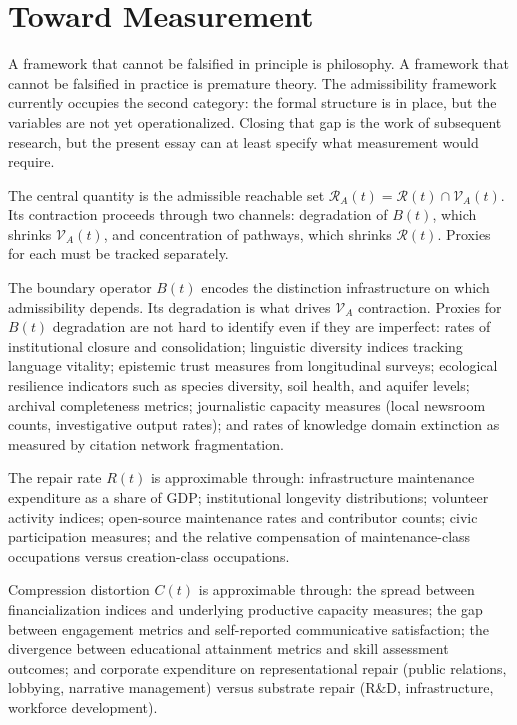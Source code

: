 \documentclass[11pt, letterpaper]{article}
\begin{document}
\section{Toward Measurement}

A framework that cannot be falsified in principle is philosophy. A framework that cannot be falsified in practice is premature theory. The admissibility framework currently occupies the second category: the formal structure is in place, but the variables are not yet operationalized. Closing that gap is the work of subsequent research, but the present essay can at least specify what measurement would require.

The central quantity is the admissible reachable set $\mathcal{R}_A(t) = \mathcal{R}(t) \cap \mathcal{V}_A(t)$. Its contraction proceeds through two channels: degradation of $B(t)$, which shrinks $\mathcal{V}_A(t)$, and concentration of pathways, which shrinks $\mathcal{R}(t)$. Proxies for each must be tracked separately.

The boundary operator $B(t)$ encodes the distinction infrastructure on which admissibility depends. Its degradation is what drives $\mathcal{V}_A$ contraction. Proxies for $B(t)$ degradation are not hard to identify even if they are imperfect: rates of institutional closure and consolidation; linguistic diversity indices tracking language vitality; epistemic trust measures from longitudinal surveys; ecological resilience indicators such as species diversity, soil health, and aquifer levels; archival completeness metrics; journalistic capacity measures (local newsroom counts, investigative output rates); and rates of knowledge domain extinction as measured by citation network fragmentation.

The repair rate $R(t)$ is approximable through: infrastructure maintenance expenditure as a share of GDP; institutional longevity distributions; volunteer activity indices; open-source maintenance rates and contributor counts; civic participation measures; and the relative compensation of maintenance-class occupations versus creation-class occupations.

Compression distortion $C(t)$ is approximable through: the spread between financialization indices and underlying productive capacity measures; the gap between engagement metrics and self-reported communicative satisfaction; the divergence between educational attainment metrics and skill assessment outcomes; and corporate expenditure on representational repair (public relations, lobbying, narrative management) versus substrate repair (R\&D, infrastructure, workforce development).
\end{document}
